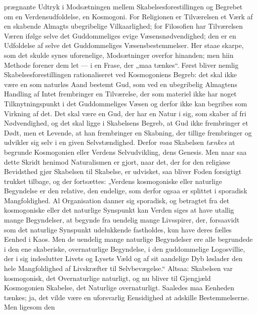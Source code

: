 \documentclass[12pt,a4paper,openany]{book}
\newcommand{\opage}[1]{\marginnote{\footnotesize\textit{[#1]}}}
\begin{document}
prægnante Udtryk i Modsætningen mellem Skabelsesforestillingen
og Begrebet om en Verdensudfoldelse, en Kosmogoni. For
Religionen er Tilværelsen et Værk af en skabende Almagts ubegribelige
Vilkaarlighed; for Filosofien har Tilværelsen Væren
ifølge selve det Guddommeliges evige Væsensnødvendighed; den
er en Udfoldelse af selve det Guddommeliges Væsensbestemmelser.
Her staae skarpe, som det skulde synes uforenelige,
Modsætninger overfor hinanden; men hiin Methode forener
dem let --- i en Frase, der „maa tænkes“. Først bliver nemlig
Skabelsesforestillingen rationaliseret ved Kosmogoniens Begreb:
\opage{441}det skal ikke være en som naturløs Aand bestemt Gud, som
ved en ubegribelig Almagtens Handling af Intet frembringer
en Tilværelse, der som materiel ikke har noget Tilknytningspunkt
i det Guddommeliges Væsen og derfor ikke kan begribes
som Virkning af det. Det skal være en Gud, der har en
Natur i sig, som skaber af fri Nødvendighed, og det skal
ligge i Skabelsens Begreb, at Gud ikke frembringer et Dødt,
men et Levende, at han frembringer en Skabning, der tillige
frembringer og udvikler sig selv i en given Selvstændighed.
Derfor \emph{maa} Skabelsen \emph{tænkes} at begrunde Kosmogonien
eller Verdens Selvudvikling, dens Genesis. Men naar saa
dette Skridt henimod Naturalismen er gjort, naar det, der
for den religiøse Bevidsthed gjør Skabelsen til Skabelse, er
udvisket, saa bliver Foden forsigtigt trukket tilbage, og der
fortsættes: „Verdens kosmogoniske eller naturlige Begyndelse
er den relative, den endelige, som derfor ogsaa er splittet i
sporadisk Mangfoldighed. Al Organisation danner sig sporadisk,
og betragtet fra det kosmogoniske eller det naturlige
Synspunkt kan Verden siges at have utallig mange Begyndelser,
at begynde fra uendelig mange Livsspirer, der, forsaavidt
som det naturlige Synspunkt udelukkende fastholdes,
kun have deres fælles Eenhed i Kaos. Men de uendelig
mange naturlige Begyndelser ere alle begrundede i den ene
skaberiske, overnaturlige Begyndelse, i den guddommelige Logosvillie,
der i sig indeslutter Livets og Lysets Væld og af sit
aandelige Dyb løslader den hele Mangfoldighed af Livskræfter
til Selvbevægelse.“ Altsaa: Skabelsen var kosmogonisk,
det Overnaturlige naturligt, og nu bliver til Gjengjæld
Kosmogonien Skabelse, det Naturlige overnaturligt. Saaledes
maa Eenheden tænkes; ja, det vilde være en uforsvarlig
Eensidighed at adskille Bestemmelserne. Men ligesom den
\end{document}
